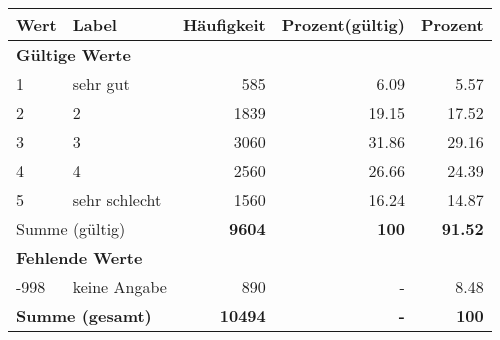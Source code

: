      \begin{longtable}{lXrrr}
     \toprule
     \textbf{Wert} & \textbf{Label} & \textbf{Häufigkeit} & \textbf{Prozent(gültig)} & \textbf{Prozent} \\
     \endhead
     \midrule
     \multicolumn{5}{l}{\textbf{Gültige Werte}}\\

     1 &
     \multicolumn{1}{X}{ sehr gut   } &


       \num{585} &
       \num[round-mode=places,round-precision=2]{6,09} &
         \num[round-mode=places,round-precision=2]{5,57} \\

     2 &
     \multicolumn{1}{X}{ 2   } &


       \num{1839} &
       \num[round-mode=places,round-precision=2]{19,15} &
         \num[round-mode=places,round-precision=2]{17,52} \\

     3 &
     \multicolumn{1}{X}{ 3   } &


       \num{3060} &
       \num[round-mode=places,round-precision=2]{31,86} &
         \num[round-mode=places,round-precision=2]{29,16} \\

     4 &
     \multicolumn{1}{X}{ 4   } &


       \num{2560} &
       \num[round-mode=places,round-precision=2]{26,66} &
         \num[round-mode=places,round-precision=2]{24,39} \\

     5 &
     \multicolumn{1}{X}{ sehr schlecht   } &


       \num{1560} &
       \num[round-mode=places,round-precision=2]{16,24} &
         \num[round-mode=places,round-precision=2]{14,87} \\
     \midrule
     \multicolumn{2}{l}{Summe (gültig)} &
       \textbf{\num{9604}} &
     \textbf{100} &
       \textbf{\num[round-mode=places,round-precision=2]{91,52}} \\
     \multicolumn{5}{l}{\textbf{Fehlende Werte}}\\
       -998 &
       keine Angabe &
         \num{890} &
        - &
         \num[round-mode=places,round-precision=2]{8,48} \\
     \midrule
     \multicolumn{2}{l}{\textbf{Summe (gesamt)}} &
          \textbf{\num{10494}} &
        \textbf{-} &
        \textbf{100} \\
     \bottomrule
     \end{longtable}
     
